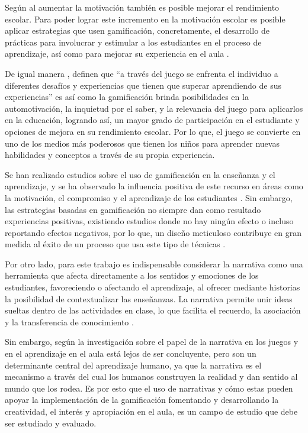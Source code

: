 Según  al aumentar la motivación también es posible mejorar el rendimiento escolar. Para 
poder lograr este incremento en la motivación escolar es posible aplicar estrategias que usen gamificación, 
concretamente, el desarrollo de prácticas para involucrar y estimular a los estudiantes en el proceso de 
aprendizaje, así como para mejorar su experiencia en el aula \cite{SBIE8805}.

De igual manera , definen que ``a través del juego se enfrenta el individuo a diferentes 
desafíos y experiencias que tienen que superar aprendiendo de sus experiencias'' es así como la gamificación 
brinda posibilidades en la automotivación, la inquietud por el saber, y la relevancia del juego para 
aplicarlos en la educación, logrando así, un mayor grado de participación en el estudiante y opciones de 
mejora en su rendimiento escolar. Por lo que, el juego se convierte en uno de los medios más poderosos que 
tienen los niños para aprender nuevas habilidades y conceptos a través de su propia experiencia.

Se han realizado estudios sobre el uso de gamificación en la enseñanza y el aprendizaje, y se ha observado la 
influencia positiva de este recurso en áreas como la motivación, el compromiso y el aprendizaje de los 
estudiantes \cite{DING20191}. Sin embargo, las estrategias basadas en gamificación no siempre dan como 
resultado experiencias positivas, existiendo estudios donde no hay ningún efecto o incluso reportando efectos 
negativos, por lo que, un diseño meticuloso contribuye en gran medida al éxito de un proceso que usa este tipo
de técnicas \cite{DING20191}.

Por otro lado, para este trabajo es indispensable considerar la narrativa como una herramienta que afecta
directamente a los sentidos y emociones de los estudiantes, favoreciendo o afectando el aprendizaje, al 
ofrecer mediante historias la posibilidad de contextualizar las enseñanzas. La narrativa permite unir ideas 
sueltas dentro de las actividades en clase, lo que facilita el recuerdo, la asociación y la transferencia de 
conocimiento \cite{tornero2016ideas}.

Sin embargo, según  la investigación sobre el papel de la narrativa en los juegos y en el 
aprendizaje en el aula está lejos de ser concluyente, pero son un determinante central del aprendizaje 
humano, ya que la narrativa es el mecanismo a través del cual los humanos construyen la realidad y dan sentido 
al mundo que los rodea. Es por esto que el uso de narrativas y cómo estas pueden apoyar la implementación de 
la gamificación fomentando y desarrollando la creatividad, el interés y apropiación en el aula, es un campo
de estudio que debe ser estudiado y evaluado.

